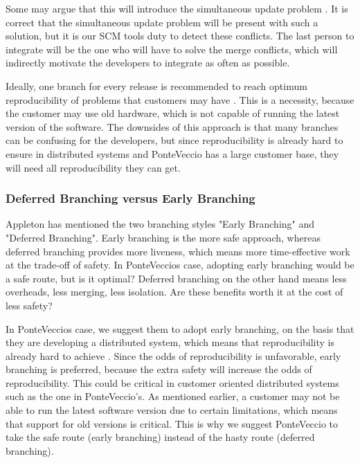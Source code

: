 \documentclass[10pt]{article}
\begin{document}
\noindent Some may argue that this will introduce the simultaneous update problem \cite{Babich}. It is correct that the simultaneous update problem will be present with such a solution, but it is our SCM tools duty to detect these conflicts. The last person to integrate will be the one who will have to solve the merge conflicts, which will indirectly motivate the developers to integrate as often as possible.

\noindent Ideally, one branch for every release is recommended to reach optimum reproducibility of problems that customers may have \cite{Vance}. This is a necessity, because the customer may use old hardware, which is not capable of running the latest version of the software. The downsides of this approach is that many branches can be confusing for the developers, but since reproducibility is already hard to ensure in distributed systems and PonteVeccio has a large customer base, they will need all reproducibility they can get.

\subsubsection{Deferred Branching versus Early Branching}
\noindent Appleton \cite{Appleton} has mentioned the two branching styles "Early Branching" and "Deferred Branching". Early branching is the more safe approach, whereas deferred branching provides more liveness\cite{Appleton}, which means more time-effective work at the trade-off of safety. In PonteVeccios case, adopting early branching would be a safe route, but is it optimal? Deferred branching on the other hand means less overheads, less merging, less isolation. Are these benefits worth it at the cost of less safety? 

\noindent In PonteVeccios case, we suggest them to adopt early branching, on the basis that they are developing a distributed system, which means that reproducibility is already hard to achieve \cite{Bays}. Since the odds of reproducibility is unfavorable, early branching is preferred, because the extra safety will increase the odds of reproducibility. This could be critical in customer oriented distributed systems such as the one in PonteVeccio's. As mentioned earlier, a customer may not be able to run the latest software version due to certain limitations, which means that support for old versions is critical. This is why we suggest PonteVeccio to take the safe route (early branching) instead of the hasty route (deferred branching).
\end{document}
